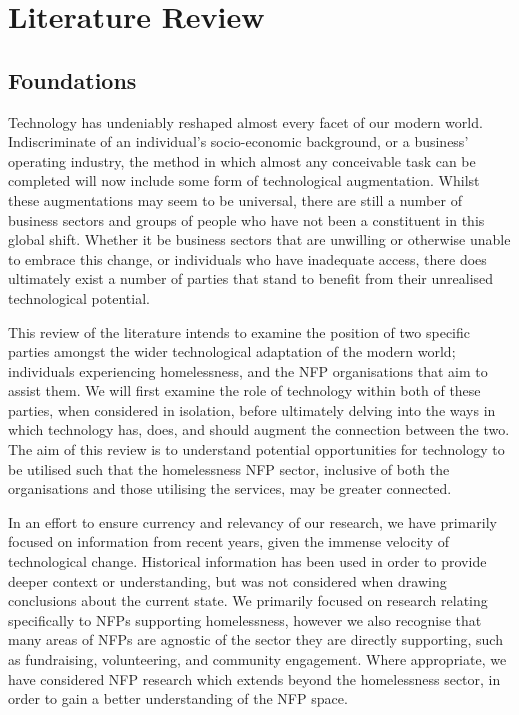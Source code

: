 \chapter{Literature Review}

\section{Foundations}

Technology has undeniably reshaped almost every facet of our modern world. Indiscriminate of an individual's socio-economic background, or a business' operating industry, the method in which almost any conceivable task can be completed will now include some form of technological augmentation. Whilst these augmentations may seem to be universal, there are still a number of business sectors and groups of people who have not been a constituent in this global shift. Whether it be business sectors that are unwilling or otherwise unable to embrace this change, or individuals who have inadequate access, there does ultimately exist a number of parties that stand to benefit from their unrealised technological potential.

This review of the literature intends to examine the position of two specific parties amongst the wider technological adaptation of the modern world; individuals experiencing homelessness, and the NFP organisations that aim to assist them. We will first examine the role of technology within both of these parties, when considered in isolation, before ultimately delving into the ways in which technology has, does, and should augment the connection between the two. The aim of this review is to understand potential opportunities for technology to be utilised such that the homelessness NFP sector, inclusive of both the organisations and those utilising the services, may be greater connected.

In an effort to ensure currency and relevancy of our research, we have primarily focused on information from recent years, given the immense velocity of technological change. Historical information has been used in order to provide deeper context or understanding, but was not considered when drawing conclusions about the current state. We primarily focused on research relating specifically to NFPs supporting homelessness, however we also recognise that many areas of NFPs are agnostic of the sector they are directly supporting, such as fundraising, volunteering, and community engagement. Where appropriate, we have considered NFP research which extends beyond the homelessness sector, in order to gain a better understanding of the NFP space.

